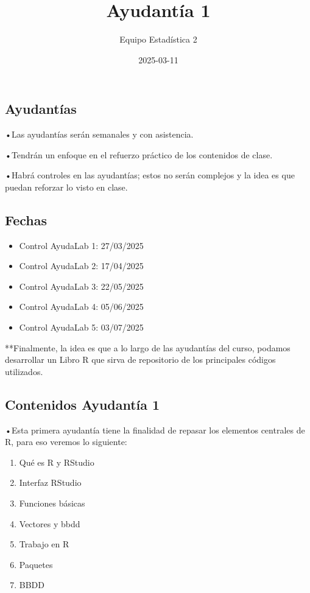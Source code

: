 \documentclass[
]{article}
\title{Ayudantía 1}
\author{Equipo Estadística 2}
\date{2025-03-11}
\providecommand{\tightlist}{%
  \setlength{\itemsep}{0pt}\setlength{\parskip}{0pt}}
\begin{document}
\maketitle

\subsection{Ayudantías}\label{ayudantuxedas}

•Las ayudantías serán semanales y con asistencia.

•Tendrán un enfoque en el refuerzo práctico de los contenidos de clase.

•Habrá controles en las ayudantías; estos no serán complejos y la idea
es que puedan reforzar lo visto en clase.

\subsection{Fechas}\label{fechas}

\begin{itemize}
\item
  Control AyudaLab 1: 27/03/2025
\item
  Control AyudaLab 2: 17/04/2025
\item
  Control AyudaLab 3: 22/05/2025
\item
  Control AyudaLab 4: 05/06/2025
\item
  Control AyudaLab 5: 03/07/2025
\end{itemize}

**Finalmente, la idea es que a lo largo de las ayudantías del curso,
podamos desarrollar un Libro R que sirva de repositorio de los
principales códigos utilizados.

\subsection{Contenidos Ayudantía 1}\label{contenidos-ayudantuxeda-1}

•Esta primera ayudantía tiene la finalidad de repasar los elementos
centrales de R, para eso veremos lo siguiente:

\begin{enumerate}
\def\labelenumi{\arabic{enumi}.}
\tightlist
\item
  Qué es R y RStudio
\item
  Interfaz RStudio
\item
  Funciones básicas
\item
  Vectores y bbdd
\item
  Trabajo en R
\item
  Paquetes
\item
  BBDD
\end{enumerate}
\end{document}
